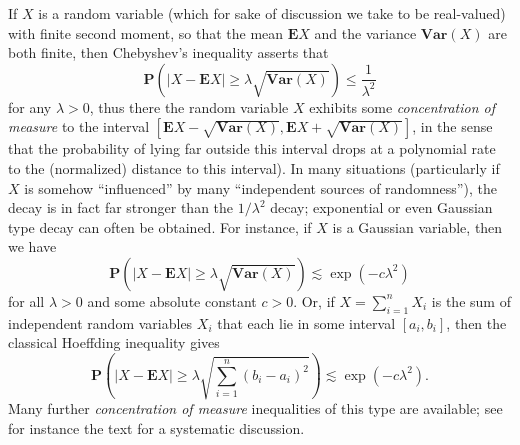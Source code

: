 \documentclass[12pt,a4paper,reqno]{amsart}
\numberwithin{equation}{section}
\theoremstyle{plain}
\theoremstyle{definition}
\newcommand\E{\mathbf{E}}
\renewcommand\P{\mathbf{P}}
\newcommand\Var{\mathbf{Var}}
\begin{document}
If $X$ is a random variable (which for sake of discussion we take to be real-valued) with finite second moment, so that the mean $\E X$ and the variance $\Var(X)$ are both finite, then Chebyshev's inequality asserts that
$$ \P( |X - \E X| \geq \lambda \sqrt{\Var(X)} ) \leq \frac{1}{\lambda^2}$$
for any $\lambda>0$, thus there the random variable $X$ exhibits some \emph{concentration of measure} to the interval $[\E X - \sqrt{\Var(X)}, \E X + \sqrt{\Var(X)}]$, in the sense that the probability of lying far outside this interval drops at a polynomial rate to the (normalized) distance to this interval).  In many situations (particularly if $X$ is somehow ``influenced'' by many ``independent sources of randomness''), the decay is in fact far stronger than the $1/\lambda^2$ decay; exponential or even Gaussian type decay can often be obtained.  For instance, if $X$ is a Gaussian variable, then we have
\begin{equation}\label{xex}
 \P( |X - \E X| \geq \lambda \sqrt{\Var(X)} ) \lesssim \exp( - c\lambda^2)
\end{equation}
for all $\lambda>0$ and some absolute constant $c>0$.  Or, if $X = \sum_{i=1}^n X_i$ is the sum of independent random variables $X_i$ that each lie in some interval $[a_i,b_i]$, then the classical Hoeffding inequality gives
$$ \P\left( |X - \E X| \geq \lambda \sqrt{\sum_{i=1}^n (b_i-a_i)^2} \right) \lesssim \exp( - c\lambda^2).$$
Many further \emph{concentration of measure} inequalities of this type are available; see for instance the text \cite{ledoux} for a systematic discussion.
\end{document}
